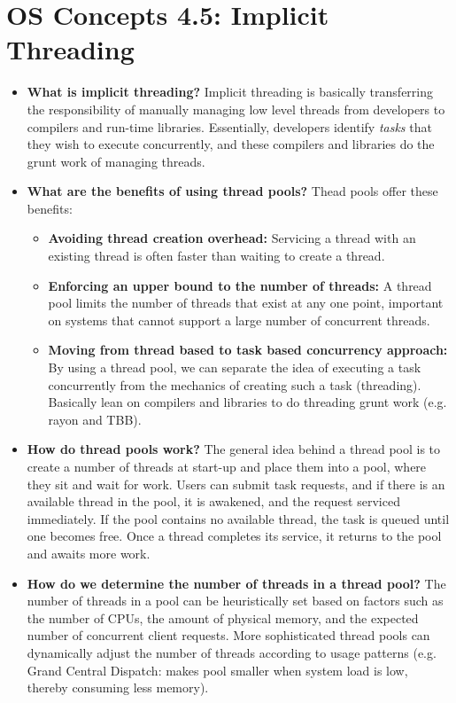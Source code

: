 \documentclass[12pt]{article}
\begin{document}
\section*{OS Concepts 4.5: Implicit Threading}

\begin{itemize}
    \item \textbf{What is implicit threading?} Implicit threading is basically transferring the responsibility of manually managing low level threads from developers to compilers and run-time libraries. Essentially, developers identify \textit{tasks} that they wish to execute concurrently, and these compilers and libraries do the grunt work of managing threads.
    \item \textbf{What are the benefits of using thread pools?} Thead pools offer these benefits:
        \begin{itemize}
            \item \textbf{Avoiding thread creation overhead:} Servicing a thread with an existing thread is often faster than waiting to create a thread.
            \item \textbf{Enforcing an upper bound to the number of threads:} A thread pool limits the number of threads that exist at any one point, important on systems that cannot support a large number of concurrent threads.
            \item \textbf{Moving from thread based to task based concurrency approach:} By using a thread pool, we can separate the idea of executing a task concurrently from the mechanics of creating such a task (threading). Basically lean on compilers and libraries to do threading grunt work (e.g. rayon and TBB).
        \end{itemize}
    \item \textbf{How do thread pools work?} The general idea behind a thread pool is to create a number of threads at start-up and place them into a pool, where they sit and wait for work. Users can submit task requests, and if there is an available thread in the pool, it is awakened, and the request serviced immediately. If the pool contains no available thread, the task is queued until one becomes free. Once a thread completes its service, it returns to the pool and awaits more work.
    \item \textbf{How do we determine the number of threads in a thread pool?} The number of threads in a pool can be heuristically set based on factors such as the number of CPUs, the amount of physical memory, and the expected number of concurrent client requests. More sophisticated thread pools can dynamically adjust the number of threads according to usage patterns (e.g. Grand Central Dispatch: makes pool smaller when system load is low, thereby consuming less memory).
\end{itemize}
\end{document}
